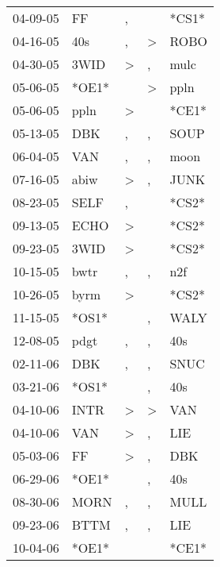 \begin{supertabular}{lllll}
 04-09-05 &     FF &                , &                  &  *CS1* \\
 04-16-05 &    40s &                , &     \textgreater &   ROBO \\
 04-30-05 &   3WID &     \textgreater &                , &   mulc \\
 05-06-05 &  *OE1* &                  &     \textgreater &   ppln \\
 05-06-05 &   ppln &     \textgreater &                  &  *CE1* \\
 05-13-05 &    DBK &                , &                , &   SOUP \\
 06-04-05 &    VAN &                , &                , &   moon \\
 07-16-05 &   abiw &     \textgreater &                , &   JUNK \\
 08-23-05 &   SELF &                , &                  &  *CS2* \\
 09-13-05 &   ECHO &     \textgreater &                  &  *CS2* \\
 09-23-05 &   3WID &     \textgreater &                  &  *CS2* \\
 10-15-05 &   bwtr &                , &                , &    n2f \\
 10-26-05 &   byrm &     \textgreater &                  &  *CS2* \\
 11-15-05 &  *OS1* &                  &                , &   WALY \\
 12-08-05 &   pdgt &                , &                , &    40s \\
 02-11-06 &    DBK &                , &                , &   SNUC \\
 03-21-06 &  *OS1* &                  &                , &    40s \\
 04-10-06 &   INTR &     \textgreater &     \textgreater &    VAN \\
 04-10-06 &    VAN &     \textgreater &                , &    LIE \\
 05-03-06 &     FF &     \textgreater &                , &    DBK \\
 06-29-06 &  *OE1* &                  &                , &    40s \\
 08-30-06 &   MORN &                , &                , &   MULL \\
 09-23-06 &   BTTM &                , &                , &    LIE \\
 10-04-06 &  *OE1* &                  &                  &  *CE1* \\

\end{supertabular}
